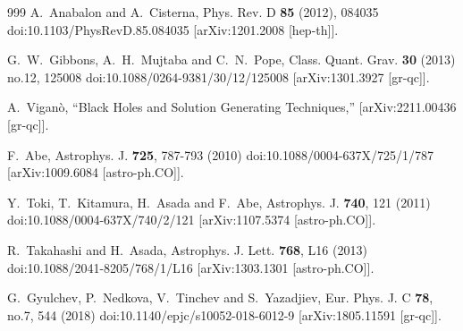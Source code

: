 \documentclass[aps,preprint,groupedaddress,nofootinbib,superscriptaddress,showkeys,showpacs,eqsecnum,amsmath,amssymb]{revtex4-1}
\begin{document}
\begin{thebibliography}{999}
A.~Anabalon and A.~Cisterna,
Phys. Rev. D \textbf{85} (2012), 084035
doi:10.1103/PhysRevD.85.084035
[arXiv:1201.2008 [hep-th]].

G.~W.~Gibbons, A.~H.~Mujtaba and C.~N.~Pope,
Class. Quant. Grav. \textbf{30} (2013) no.12, 125008
doi:10.1088/0264-9381/30/12/125008
[arXiv:1301.3927 [gr-qc]].





A.~Vigan\`o,
``Black Holes and Solution Generating Techniques,''
[arXiv:2211.00436 [gr-qc]].




F.~Abe,
Astrophys. J. \textbf{725}, 787-793 (2010)
doi:10.1088/0004-637X/725/1/787
[arXiv:1009.6084 [astro-ph.CO]].


Y.~Toki, T.~Kitamura, H.~Asada and F.~Abe,
Astrophys. J. \textbf{740}, 121 (2011)
doi:10.1088/0004-637X/740/2/121
[arXiv:1107.5374 [astro-ph.CO]].

R.~Takahashi and H.~Asada,
Astrophys. J. Lett. \textbf{768}, L16 (2013)
doi:10.1088/2041-8205/768/1/L16
[arXiv:1303.1301 [astro-ph.CO]].


G.~Gyulchev, P.~Nedkova, V.~Tinchev and S.~Yazadjiev,
Eur. Phys. J. C \textbf{78}, no.7, 544 (2018)
doi:10.1140/epjc/s10052-018-6012-9
[arXiv:1805.11591 [gr-qc]].




\end{thebibliography}
\end{document}
